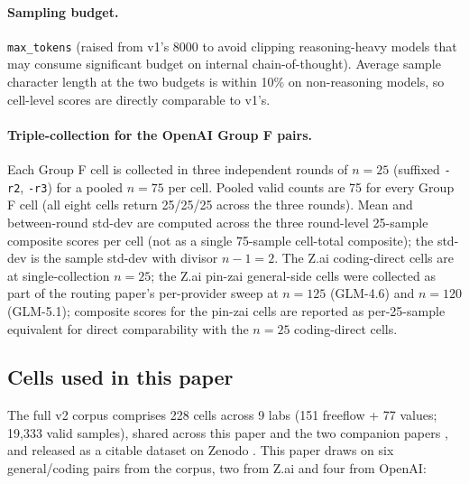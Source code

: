 \documentclass[11pt,a4paper]{article}
\begin{document}
\paragraph{Sampling budget.} \texttt{max\_tokens} (raised from v1's 8000 to avoid clipping reasoning-heavy models that may consume significant budget on internal chain-of-thought). Average sample character length at the two budgets is within 10\% on non-reasoning models, so cell-level scores are directly comparable to v1's.

\paragraph{Triple-collection for the OpenAI Group F pairs.} Each Group F cell is collected in three independent rounds of $n{=}25$ (suffixed \texttt{-r2}, \texttt{-r3}) for a pooled $n{=}75$ per cell. Pooled valid counts are 75 for every Group F cell (all eight cells return 25/25/25 across the three rounds). Mean and between-round std-dev are computed across the three round-level 25-sample composite scores per cell (not as a single 75-sample cell-total composite); the std-dev is the sample std-dev with divisor $n{-}1{=}2$. The Z.ai coding-direct cells are at single-collection $n{=}25$; the Z.ai pin-zai general-side cells were collected as part of the routing paper's per-provider sweep at $n{=}125$ (GLM-4.6) and $n{=}120$ (GLM-5.1); composite scores for the pin-zai cells are reported as per-25-sample equivalent for direct comparability with the $n{=}25$ coding-direct cells.

\subsection{Cells used in this paper}

The full v2 corpus comprises 228 cells across 9 labs (151 freeflow + 77 values; 19{,}333 valid samples), shared across this paper and the two companion papers \citep{tenner2026drift, tenner2026routing}, and released as a citable dataset on Zenodo \citep{tenner2026corpus}. This paper draws on six general/coding pairs from the corpus, two from Z.ai and four from OpenAI:
\end{document}
